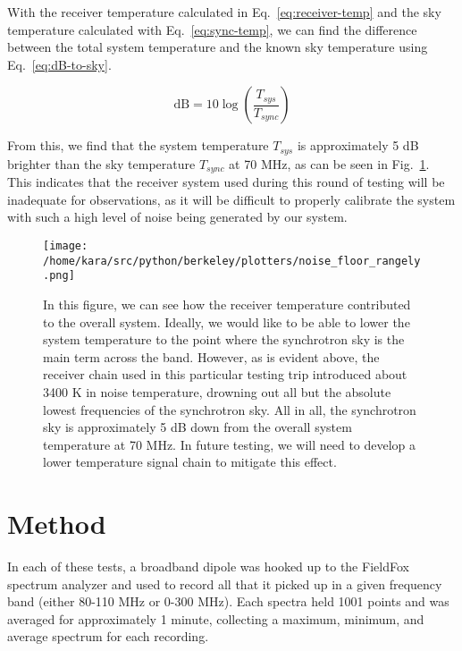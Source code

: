 \documentclass[11pt]{article}
\begin{document}
With the receiver temperature calculated in Eq.~\eqref{eq:receiver-temp} and 
the sky temperature calculated with Eq.~\eqref{eq:sync-temp}, we can find the 
difference between the total system temperature and the known sky temperature 
using Eq.~\eqref{eq:dB-to-sky}.

\begin{equation}
    \label{eq:dB-to-sky}
    \textrm{dB} = 10 \log\left(\frac{T_{sys}}{T_{sync}}\right)
\end{equation}

From this, we find that the system temperature $T_{sys}$ is approximately 5 dB 
brighter than the sky temperature $T_{sync}$ at 70 MHz, as can be seen in 
Fig.~\ref{fig:noise-floor}.  This indicates that the receiver system used 
during this round of testing will be inadequate for observations, as it will be 
difficult to properly calibrate the system with such a high level of noise 
being generated by our system.

\begin{figure}
    \begin{center}
    \texttt{[image: /home/kara/src/python/berkeley/plotters/noise\_floor\_rangely.png]}
    \end{center}
    \caption{
        In this figure, we can see how the receiver temperature contributed to 
        the overall system. Ideally, we would like to be able to lower the 
        system temperature to the point where the synchrotron sky is the main 
        term across the band. However, as is evident above, the receiver chain 
        used in this particular testing trip introduced about 3400 K in noise 
        temperature, drowning out all but the absolute lowest frequencies of 
        the synchrotron sky. All in all, the synchrotron sky is approximately 5 
        dB down from the overall system temperature at 70 MHz.  In future 
        testing, we will need to develop a lower temperature signal chain to 
        mitigate this effect.
    }
    \label{fig:noise-floor}
\end{figure}

\section{Method}

In each of these tests, a broadband dipole was hooked up to the FieldFox 
spectrum analyzer and used to record all that it picked up in a given frequency 
band (either 80-110 MHz or 0-300 MHz). Each spectra held 1001 points and was 
averaged for approximately 1 minute, collecting a maximum, minimum, and average 
spectrum for each recording.
\end{document}
